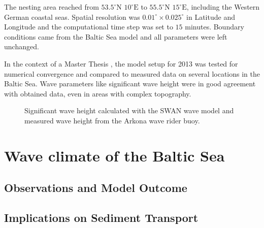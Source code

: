 The nesting area reached from $53.5^\circ \text{N } 10^\circ \text{E}$ to 
$55.5^\circ \text{N } 15^\circ \text{E}$, including the Western German coastal 
seas. Spatial resolution was $0.01^\circ \times 0.025^\circ $ in Latitude and 
Longitude and the computational time step was set to $15$ minutes. Boundary 
conditions came from the Baltic Sea model and all parameters were left 
unchanged.


In the context of a Master Thesis \citep[][]{masterarbeitronja}, the model setup 
for 2013 was tested for numerical convergence and compared to measured data on 
several locations in the Baltic Sea. Wave parameters like significant wave 
height were in good agreement with obtained data, even in areas with complex 
topography.


\begin{figure}[h]
 \caption{Significant wave height calculated with the SWAN wave model and measured wave height from the Arkona wave rider buoy.}
\end{figure}

\section{Wave climate of the Baltic Sea}	

\subsection{Observations and Model Outcome}

\subsection{Implications on Sediment Transport}